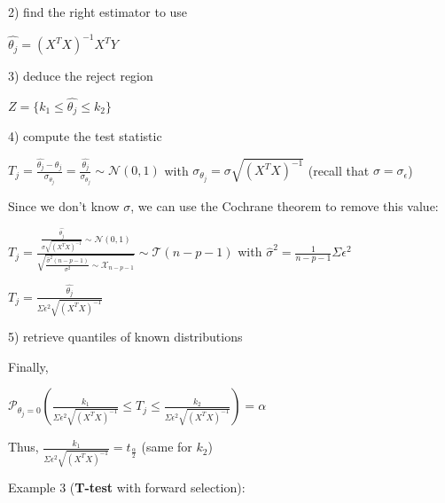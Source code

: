 \vspace{5mm}

2) find the right estimator to use

\vspace{5mm}

$\widehat{\theta_j} = (X^TX)^{-1}X^TY$

\vspace{5mm}

3) deduce the reject region

\vspace{5mm}

$Z=\{k_1 \leq \widehat{\theta_j} \leq k_2\}$

\vspace{5mm}

4) compute the test statistic

\vspace{5mm}

$T_j = \frac{\widehat{\theta_j}-\theta_j}{\sigma_{\theta_j}} = \frac{\widehat{\theta_j}}{\sigma_{\theta_j}}  \sim \mathcal{N}(0,1)$ with $\sigma_{\theta_j} = \sigma \sqrt{(X^TX)^{-1}}$ (recall that $\sigma = \sigma_{\epsilon}$)

\vspace{5mm}

Since we don't know $\sigma$, we can use the Cochrane theorem to remove this value:

$T_j = \frac{ \frac{\widehat{\theta_j}}{\sigma \sqrt{(X^TX)^{-1}}} \sim \mathcal{N}(0,1)}{\sqrt{\frac{\widehat{\sigma}^2 (n-p-1)}{\sigma^2} \sim \mathcal{X}_{n-p-1}}} \sim \mathcal{T}(n-p-1)$ with $\widehat{\sigma}^2 = \frac{1}{n-p-1} \Sigma \epsilon ^2$

$ T_j = \frac{\widehat{\theta_j}}{\Sigma \epsilon ^2 \sqrt{(X^TX)^{-1}}}$

\vspace{5mm}

5) retrieve quantiles of known distributions

\vspace{5mm}

Finally,


$\mathcal{P}_{\theta_j=0}(\frac{k_1}{\Sigma \epsilon ^2 \sqrt{(X^TX)^{-1}}} \leq T_j \leq \frac{k_2}{\Sigma \epsilon ^2 \sqrt{(X^TX)^{-1}}}) = \alpha$

Thus, $\frac{k_1}{\Sigma \epsilon ^2 \sqrt{(X^TX)^{-1}}} = t_{\frac{\alpha}{2}}$ (same for $k_2$)

\vspace{5mm}

Example 3 (\textbf{T-test} with forward selection):

